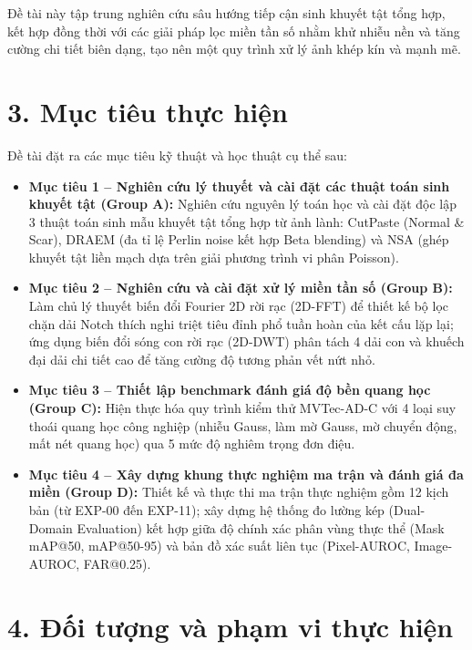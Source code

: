 Đề tài này tập trung nghiên cứu sâu hướng tiếp cận sinh khuyết tật tổng hợp, kết hợp đồng thời với các giải pháp lọc miền tần số nhằm khử nhiễu nền và tăng cường chi tiết biên dạng, tạo nên một quy trình xử lý ảnh khép kín và mạnh mẽ.

\section*{3. Mục tiêu thực hiện}

Đề tài đặt ra các mục tiêu kỹ thuật và học thuật cụ thể sau:
\begin{itemize}
    \item \textbf{Mục tiêu 1 -- Nghiên cứu lý thuyết và cài đặt các thuật toán sinh khuyết tật (Group A):} Nghiên cứu nguyên lý toán học và cài đặt độc lập 3 thuật toán sinh mẫu khuyết tật tổng hợp từ ảnh lành: CutPaste (Normal \& Scar), DRAEM (đa tỉ lệ Perlin noise kết hợp Beta blending) và NSA (ghép khuyết tật liền mạch dựa trên giải phương trình vi phân Poisson).
    \item \textbf{Mục tiêu 2 -- Nghiên cứu và cài đặt xử lý miền tần số (Group B):} Làm chủ lý thuyết biến đổi Fourier 2D rời rạc (2D-FFT) để thiết kế bộ lọc chặn dải Notch thích nghi triệt tiêu đỉnh phổ tuần hoàn của kết cấu lặp lại; ứng dụng biến đổi sóng con rời rạc (2D-DWT) phân tách 4 dải con và khuếch đại dải chi tiết cao để tăng cường độ tương phản vết nứt nhỏ.
    \item \textbf{Mục tiêu 3 -- Thiết lập benchmark đánh giá độ bền quang học (Group C):} Hiện thực hóa quy trình kiểm thử MVTec-AD-C với 4 loại suy thoái quang học công nghiệp (nhiễu Gauss, làm mờ Gauss, mờ chuyển động, mất nét quang học) qua 5 mức độ nghiêm trọng đơn điệu.
    \item \textbf{Mục tiêu 4 -- Xây dựng khung thực nghiệm ma trận và đánh giá đa miền (Group D):} Thiết kế và thực thi ma trận thực nghiệm gồm 12 kịch bản (từ EXP-00 đến EXP-11); xây dựng hệ thống đo lường kép (Dual-Domain Evaluation) kết hợp giữa độ chính xác phân vùng thực thể (Mask mAP@50, mAP@50-95) và bản đồ xác suất liên tục (Pixel-AUROC, Image-AUROC, FAR@0.25).
\end{itemize}

\section*{4. Đối tượng và phạm vi thực hiện}

